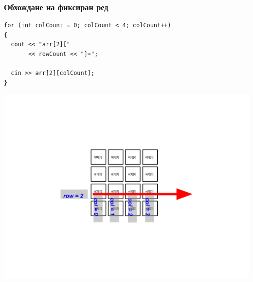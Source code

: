 \documentclass{beamer}
\begin{document}
\begin{frame}[fragile]
\frametitle{Обхождане на фиксиран ред}

\begin{flushleft}

\begin{lstlisting}
for (int colCount = 0; colCount < 4; colCount++)
{
  cout << "arr[2][" 
       << rowCount << "]=";
  
  cin >> arr[2][colCount];
}
\end{lstlisting}
\end{flushleft}

\vspace*{-120pt}
\includegraphics[width=14cm]{images/matr_iter_cols} 

\end{frame}
\end{document}
